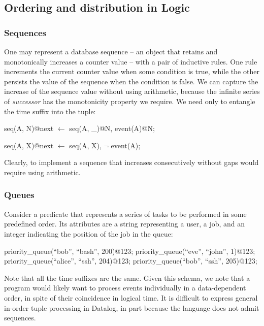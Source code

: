 \subsection{Ordering and distribution in Logic}

\subsubsection{Sequences}

One may represent a database sequence -- an object that retains and monotonically increases a counter value -- 
with a pair of inductive rules.  One rule increments the current counter value when some condition is 
true, while the other persists the value of the sequence when the condition is false.  We can capture the increase
of the sequence value without using arithmetic, because the infinite series of \emph{successor} has the monotonicity
property we require.  We need only to entangle the time suffix into the tuple:

\begin{Dedalus}
seq(A, N)@next \(\leftarrow\) seq(A, _)@N, event(A)@N;
  
seq(A, X)@next \(\leftarrow\) seq(A, X), \(\lnot\) event(A);
\end{Dedalus}


Clearly, to implement a sequence that increases consecutively without gaps would require using arithmetic.


\subsubsection{Queues}

Consider a predicate  that represents a series of tasks to be performed in some predefined order.  Its attributes are a string representing a user, a job, and an integer
indicating the position of the job in the queue:

\begin{Dedalus}
priority\_queue(``bob'', ``bash'', 200)@123;
priority\_queue(``eve'', ``john'', 1)@123;
priority\_queue(``alice'', ``ssh'', 204)@123;
priority\_queue(``bob'', ``ssh'', 205)@123;
\end{Dedalus}

Note that all the time suffixes are the same.  
Given this schema, we note that a program would likely want to process
 events individually in a data-dependent order, in
spite of their coincidence in logical time.  It is difficult to express general
in-order tuple processing in Datalog, in part because the language does not
admit sequences.

